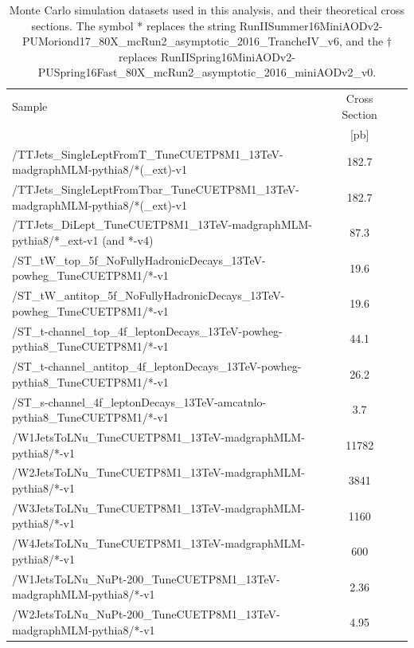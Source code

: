 \begin{table}[htp]
\caption[Monte Carlo simulation datasets used in this analysis, and
  their theoretical cross sections. The symbols * and $\dagger$ replace
  longer strings.]
  {Monte Carlo simulation datasets used in this analysis, and their
  theoretical cross sections. The symbol * replaces the string
  RunIISummer16MiniAODv2-PUMoriond17\_80X\_mcRun2\_asymptotic\_2016\_TrancheIV\_v6, %
  and the $\dagger$ replaces
  RunIISpring16MiniAODv2-PUSpring16Fast\_80X\_mcRun2\_asymptotic\_2016\_miniAODv2\_v0.}
\label{tab:stop:mcsamples}
\centering
{\footnotesize
\begin{tabular}{|l|c|c|c|}
\hline
Sample & Cross Section \\
& [pb] \\
\hline
/TTJets\_SingleLeptFromT\_TuneCUETP8M1\_13TeV-madgraphMLM-pythia8/*(\_ext)-v1 & 182.7 \\
/TTJets\_SingleLeptFromTbar\_TuneCUETP8M1\_13TeV-madgraphMLM-pythia8/*(\_ext)-v1 & 182.7 \\
/TTJets\_DiLept\_TuneCUETP8M1\_13TeV-madgraphMLM-pythia8/*\_ext-v1 (and *-v4) & 87.3 \\
/ST\_tW\_top\_5f\_NoFullyHadronicDecays\_13TeV-powheg\_TuneCUETP8M1/*-v1 & 19.6 \\
/ST\_tW\_antitop\_5f\_NoFullyHadronicDecays\_13TeV-powheg\_TuneCUETP8M1/*-v1 & 19.6 \\
/ST\_t-channel\_top\_4f\_leptonDecays\_13TeV-powheg-pythia8\_TuneCUETP8M1/*-v1 & 44.1 \\ 
/ST\_t-channel\_antitop\_4f\_leptonDecays\_13TeV-powheg-pythia8\_TuneCUETP8M1/*-v1 & 26.2 \\
/ST\_s-channel\_4f\_leptonDecays\_13TeV-amcatnlo-pythia8\_TuneCUETP8M1/*-v1 & 3.7 \\
/W1JetsToLNu\_TuneCUETP8M1\_13TeV-madgraphMLM-pythia8/*-v1 & 11782  \\
/W2JetsToLNu\_TuneCUETP8M1\_13TeV-madgraphMLM-pythia8/*-v1 & 3841 \\
/W3JetsToLNu\_TuneCUETP8M1\_13TeV-madgraphMLM-pythia8/*-v1 & 1160 \\
/W4JetsToLNu\_TuneCUETP8M1\_13TeV-madgraphMLM-pythia8/*-v1 & 600 \\
/W1JetsToLNu\_NuPt-200\_TuneCUETP8M1\_13TeV-madgraphMLM-pythia8/*-v1 & 2.36  \\
/W2JetsToLNu\_NuPt-200\_TuneCUETP8M1\_13TeV-madgraphMLM-pythia8/*-v1 & 4.95 \\

\end{tabular}}
\end{table}
